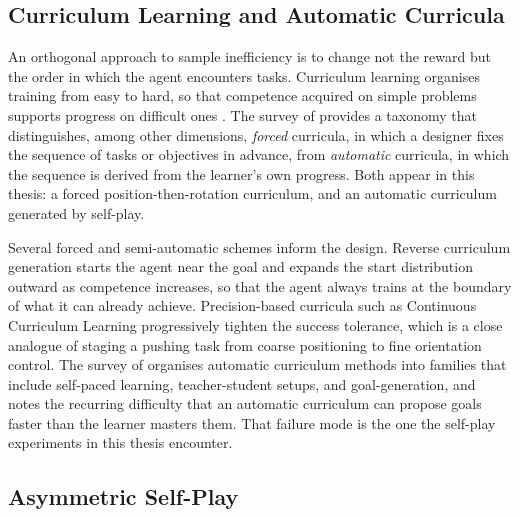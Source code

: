 \subsection{Curriculum Learning and Automatic Curricula}
\label{sec:curriculum}

An orthogonal approach to sample inefficiency is to change not the reward but
the order in which the agent encounters tasks. Curriculum learning organises
training from easy to hard, so that competence acquired on simple problems
supports progress on difficult ones \cite{Narvekar2020}. The survey of
\cite{Narvekar2020} provides a taxonomy that distinguishes, among other dimensions,
\emph{forced} curricula, in which a designer fixes the sequence of tasks or
objectives in advance, from \emph{automatic} curricula, in which the sequence is
derived from the learner's own progress. Both appear in this thesis: a forced
position-then-rotation curriculum, and an automatic curriculum generated by
self-play.

Several forced and semi-automatic schemes inform the design. Reverse curriculum
generation \cite{Florensa2017ReverseCurriculum} starts the agent near the goal
and expands the start distribution outward as competence increases, so that the
agent always trains at the boundary of what it can already achieve. Precision-based
curricula such as Continuous Curriculum Learning \cite{Luo2020AcceleratingRL}
progressively tighten the success tolerance, which is a close analogue of staging
a pushing task from coarse positioning to fine orientation control. The survey of
\cite{Portelas2020ACLSurvey} organises automatic curriculum methods into families
that include self-paced learning, teacher-student setups, and goal-generation, and
notes the recurring difficulty that an automatic curriculum can propose goals
faster than the learner masters them. That failure mode is the one the self-play
experiments in this thesis encounter.

\subsection{Asymmetric Self-Play}
\label{sec:asp}

